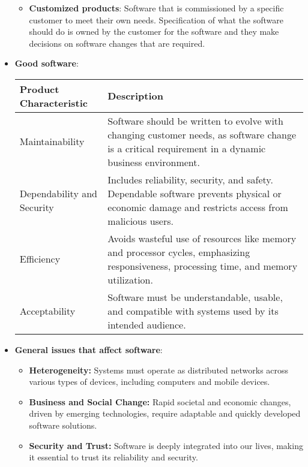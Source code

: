 \documentclass{report}
\begin{document}
\begin{itemize}
\begin{itemize}
                \item \textbf{Customized products}: Software that is commissioned by a specific customer to meet their own needs.
                    \bigbreak \noindent 
                    Specification of what the software should do is owned by the customer for the software and they make decisions on software changes that are required.
            \end{itemize}
        \item \textbf{Good software}:
            \begin{center}
                \begin{tabular}{|p{4cm}|p{10cm}|}
                    \hline
                    \textbf{Product Characteristic} & \textbf{Description} \\ \hline
                    Maintainability & Software should be written to evolve with changing customer needs, as software change is a critical requirement in a dynamic business environment. \\ \hline
                    Dependability and Security & Includes reliability, security, and safety. Dependable software prevents physical or economic damage and restricts access from malicious users. \\ \hline
                    Efficiency & Avoids wasteful use of resources like memory and processor cycles, emphasizing responsiveness, processing time, and memory utilization. \\ \hline
                    Acceptability & Software must be understandable, usable, and compatible with systems used by its intended audience. \\ \hline
                \end{tabular}
            \end{center}
        \item \textbf{General issues that affect software}:
            \begin{itemize}[noitemsep]
                \item \textbf{Heterogeneity:} Systems must operate as distributed networks across various types of devices, including computers and mobile devices.
                \item \textbf{Business and Social Change:} Rapid societal and economic changes, driven by emerging technologies, require adaptable and quickly developed software solutions.
                \item \textbf{Security and Trust:} Software is deeply integrated into our lives, making it essential to trust its reliability and security.

\end{itemize}
\end{itemize}
\end{document}
